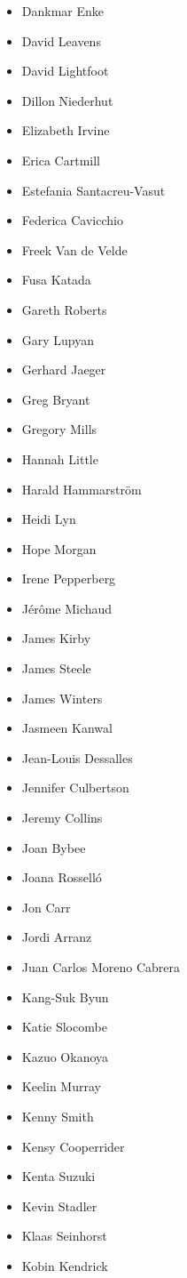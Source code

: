 \begin{multicols}{3}
\begin{itemize}[label={},leftmargin=*]
\item Dankmar Enke
\item David Leavens
\item David Lightfoot
\item Dillon Niederhut
\item Elizabeth Irvine
\item Erica Cartmill
\item Estefania Santacreu-Vasut
\item Federica Cavicchio
\item Freek Van de Velde
\item Fusa Katada
\item Gareth Roberts
\item Gary Lupyan
\item Gerhard Jaeger
\item Greg Bryant
\item Gregory Mills
\item Hannah Little
\item Harald Hammarstr\"om
\item Heidi Lyn
\item Hope Morgan
\item Irene Pepperberg
\item J\'er\^ome Michaud
\item James Kirby
\item James Steele
\item James Winters
\item Jasmeen Kanwal
\item Jean-Louis Dessalles
\item Jennifer Culbertson
\item Jeremy Collins
\item Joan Bybee
\item Joana Rossell\'o
\item Jon Carr
\item Jordi Arranz
\item Juan Carlos Moreno Cabrera
\item Kang-Suk Byun
\item Katie Slocombe
\item Kazuo Okanoya
\item Keelin Murray
\item Kenny Smith
\item Kensy Cooperrider
\item Kenta Suzuki
\item Kevin Stadler
\item Klaas Seinhorst
\item Kobin Kendrick

\end{itemize}
\end{multicols}
